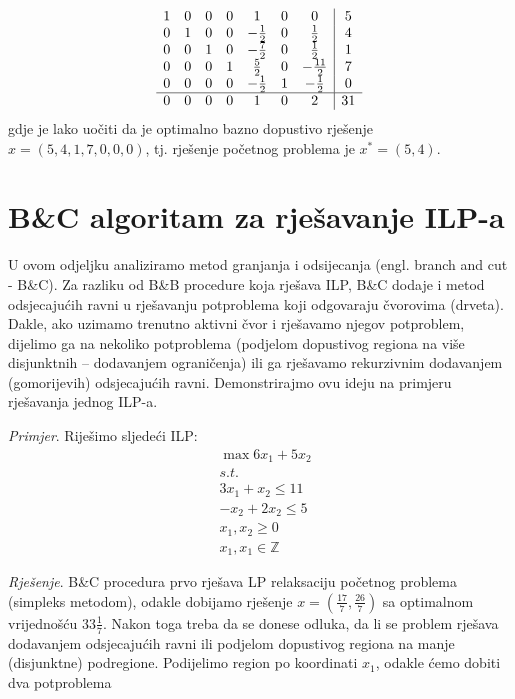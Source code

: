 \documentclass[a4paper, utf8, 11pt, colorlinks]{book}
\begin{document}
$$ \begin{array}{ccccccc| c}
    1    &   0   &   0   &  0 &  1  &   0    &    0    & 5  \\
0    &   1   &   0   &  0   &   -\frac{1}{2}    &   0   & \frac{1}{2} & 4 \\
0    &   0   &   1   &  0   &   -\frac{7}{2}    &   0   & \frac{1}{2} & 1 \\
0    &   0   &   0   &  1  &   \frac{5}{2}    &  0 &  -\frac{11}{2}    & 7 \\ 
0    &   0   &   0   &   0 &  -\frac{1}{2}    &   1   & - \frac{1}{2} & 0\\ \hline
0    &   0   &   0   &  0  &   1    &    0   & 2 & 31  
\end{array} 
$$
gdje je lako uočiti da je optimalno bazno dopustivo rješenje $x=(5, 4, 1, 7, 0, 0, 0 )$, tj. rješenje početnog problema je $x^*=(5, 4)$.

\section{B\&C algoritam za rješavanje ILP-a}
U ovom odjeljku analiziramo metod granjanja i odsijecanja (engl. branch and cut - B\&C). Za razliku od B\&B procedure koja rješava ILP, B\&C dodaje  i metod odsjecajućih ravni u rješavanju  potproblema koji odgovaraju čvorovima (drveta). Dakle, ako  uzimamo trenutno aktivni čvor i rješavamo njegov potproblem, dijelimo ga na nekoliko potproblema (podjelom dopustivog regiona na više disjunktnih -- dodavanjem ograničenja) ili ga rješavamo rekurzivnim dodavanjem (gomorijevih) odsjecajućih ravni. Demonstrirajmo ovu ideju na primjeru rješavanja jednog ILP-a.

\emph{Primjer}.  Riješimo sljedeći ILP:
\begin{align*}
    &\max 6 x_1 + 5 x_2 \\
    &  {s.t. } \\
    & 3x_1 + x_2 \leq 11 \\
    & - x_2 + 2 x_2 \leq 5 \\
    & x_1, x_2 \geq 0 \\
    & x_1, x_1 \in \mathbb{Z}
\end{align*}

\emph{Rješenje}. B\&C procedura prvo rješava LP relaksaciju početnog problema (simpleks metodom), odakle dobijamo rješenje $x=(\frac{17}{7}, \frac{26}{7})$
sa optimalnom vrijednošću $33\frac{1}{7}$. Nakon toga treba da se donese odluka, da li se problem rješava dodavanjem odsjecajućih ravni ili podjelom dopustivog regiona na manje (disjunktne) podregione. Podijelimo region po koordinati $x_1$, odakle ćemo dobiti dva potproblema 
\end{document}
